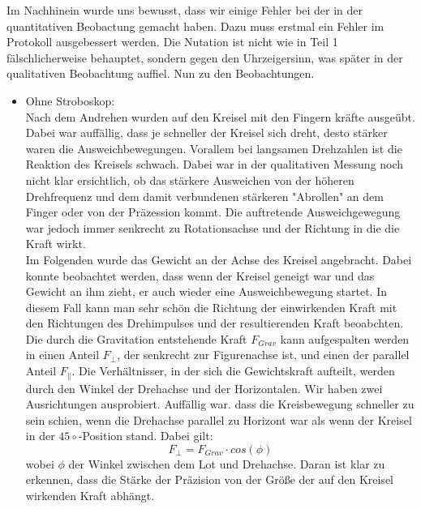 Im Nachhinein wurde uns bewusst, dass wir einige Fehler bei der in der quantitativen Beobactung gemacht haben. 
Dazu muss erstmal ein Fehler im Protokoll ausgebessert werden. Die Nutation ist nicht wie in Teil 1 fälschlicherweise 
behauptet, sondern gegen den Uhrzeigersinn, was später in der qualitativen Beobachtung auffiel. Nun zu den Beobachtungen.
\begin{itemize}
    \item Ohne Stroboskop:\\
    Nach dem Andrehen wurden auf den Kreisel mit den Fingern kräfte ausgeübt. Dabei war auffällig, dass je schneller der Kreisel sich dreht, desto stärker waren die Ausweichbewegungen.
    Vorallem bei langsamen Drehzahlen ist die Reaktion des Kreisels schwach. Dabei war in der qualitativen Messung noch nicht klar ersichtlich, ob das stärkere Ausweichen 
    von der höheren Drehfrequenz und dem damit verbundenen stärkeren "Abrollen" an dem Finger oder von der Präzession kommt. Die auftretende Ausweichgewegung war jedoch immer 
    senkrecht zu Rotationsachse und der Richtung in die die Kraft wirkt. \\
    Im Folgenden wurde das Gewicht an der Achse des Kreisel angebracht. Dabei konnte beobachtet werden, dass wenn der Kreisel geneigt war und das Gewicht an ihm zieht, er auch wieder 
    eine Ausweichbewegung startet. In diesem Fall kann man sehr schön die Richtung der einwirkenden Kraft mit den Richtungen des Drehimpulses und der resultierenden Kraft beoabchten.
    Die durch die Gravitation entstehende Kraft $F_{Grav}$ kann aufgespalten werden in einen Anteil $F_{\bot}$, der senkrecht zur Figurenachse ist, und einen der parallel Anteil $F_{\| }$. 
    Die Verhältnisser, in der sich die Gewichtskraft aufteilt, werden durch den Winkel der Drehachse und der Horizontalen. Wir haben zwei Ausrichtungen ausprobiert. Auffällig war. dass die 
    Kreisbewegung schneller zu sein schien, wenn die Drehachse parallel zu Horizont war als wenn der Kreisel in der $45\circ$-Position stand. Dabei gilt:
    \begin{equation*}
        F_{\bot} = F_{Grav} \cdot cos(\phi)
    \end{equation*}
    wobei $\phi$ der Winkel zwischen dem Lot und Drehachse.
    Daran ist klar zu erkennen, dass die Stärke der Präzision von der Größe der auf den Kreisel wirkenden Kraft abhängt.
\end{itemize}
